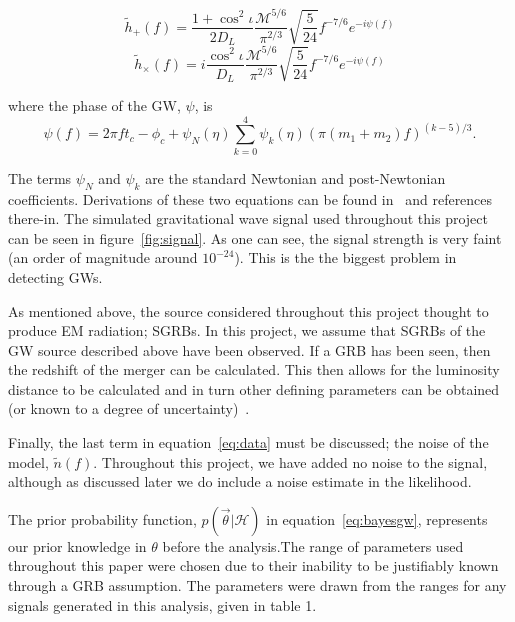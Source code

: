 \documentclass[12pt]{iopart}
\newcommand{\curlH}{\mathcal{H}}
\newcommand{\gws}{\tilde{h}}
\begin{document}
\begin{equation}
  \gws_{+}(f) = \frac{1+\cos^{2}\iota}{2D_{L}}
\frac{\mathcal{M}^{5/6}}{\pi^{2/3}} \sqrt{\frac{5}{24}}f^{-7/6}e^{-i\psi(f)}
\end{equation}
\begin{equation}
  \gws_{\times}(f) =
i\frac{\cos^{2}\iota}{D_{L}}\frac{\mathcal{M}^{5/6}}{\pi^{2/3}}
\sqrt{\frac{5}{24}}f^{-7/6}e^{-i\psi(f)}
\end{equation}

where the phase of the GW, $\psi$, is
\begin{equation}
  \label{eq:psi}
  \psi(f) = 2\pi f t_c - \phi_c + \psi_N(\eta)\sum\limits_{k=0}^4{\psi_k(\eta)
(\pi(m_1 + m_2)f)^{(k-5)/3}}.
\end{equation}

The terms $\psi_N$ and $\psi_k$ are the standard Newtonian and post-Newtonian
coefficients. Derivations of these two equations can be found in~\cite{pN} and
references there-in. The simulated gravitational wave signal used throughout
this project can be seen in figure~\ref{fig:signal}. As one can see, the signal
strength is very faint (an order of magnitude around $10^{-24}$). This is the
the biggest problem in detecting GWs.

As mentioned above, the source considered throughout this project thought to
produce EM radiation; SGRBs. In this project, we assume that SGRBs of the GW
source described above have been observed. If a GRB has been seen, then the
redshift of the merger can be calculated. This then allows for the luminosity
distance to be calculated and in turn other defining parameters can be obtained
(or known to a degree of uncertainty)~\cite{SathSchutz}.


Finally, the last term in equation~\ref{eq:data} must be discussed; the noise
of the model, $\tilde{n}(f)$. Throughout this project, we have added no noise
to the signal, although as discussed later we do include a noise estimate in
the likelihood.

The prior probability function, $p(\vec{\theta} | \curlH)$ in
equation~\ref{eq:bayesgw}, represents our prior knowledge in $\theta$ before
the analysis.The range of parameters used throughout this paper were chosen due
to their inability to be justifiably known through a GRB assumption. The
parameters were drawn from the ranges for any signals generated in this
analysis, given in table 1.
\end{document}
